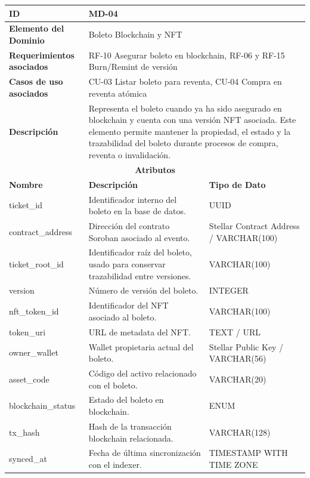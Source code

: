 \documentclass[12pt,letterpaper]{article}
\begin{document}
\begin{table}[H]
\centering
\scriptsize
\renewcommand{\arraystretch}{1.12}
\setlength{\tabcolsep}{4pt}

\begin{tabularx}{\textwidth}{|p{3.2cm}|X|p{3.8cm}|}
\hline
\textbf{ID} & MD-04 & \\ \hline

\textbf{Elemento del Dominio} & 
\multicolumn{2}{X|}{Boleto Blockchain y NFT} \\ \hline

\textbf{Requerimientos asociados} & 
\multicolumn{2}{X|}{RF-10 Asegurar boleto en blockchain, RF-06 y RF-15 Burn/Remint de versión} \\ \hline

\textbf{Casos de uso asociados} & 
\multicolumn{2}{X|}{CU-03 Listar boleto para reventa, CU-04 Compra en reventa atómica} \\ \hline

\textbf{Descripción} & 
\multicolumn{2}{X|}{Representa el boleto cuando ya ha sido asegurado en blockchain y cuenta con una versión NFT asociada. Este elemento permite mantener la propiedad, el estado y la trazabilidad del boleto durante procesos de compra, reventa o invalidación.} \\ \hline

\multicolumn{3}{|c|}{\textbf{Atributos}} \\ \hline

\textbf{Nombre} & \textbf{Descripción} & \textbf{Tipo de Dato} \\ \hline

ticket\_id & Identificador interno del boleto en la base de datos. & UUID \\ \hline
contract\_address & Dirección del contrato Soroban asociado al evento. & Stellar Contract Address / VARCHAR(100) \\ \hline
ticket\_root\_id & Identificador raíz del boleto, usado para conservar trazabilidad entre versiones. & VARCHAR(100) \\ \hline
version & Número de versión del boleto. & INTEGER \\ \hline
nft\_token\_id & Identificador del NFT asociado al boleto. & VARCHAR(100) \\ \hline
token\_uri & URL de metadata del NFT. & TEXT / URL \\ \hline
owner\_wallet & Wallet propietaria actual del boleto. & Stellar Public Key / VARCHAR(56) \\ \hline
asset\_code & Código del activo relacionado con el boleto. & VARCHAR(20) \\ \hline
blockchain\_status & Estado del boleto en blockchain. & ENUM \\ \hline
tx\_hash & Hash de la transacción blockchain relacionada. & VARCHAR(128) \\ \hline
synced\_at & Fecha de última sincronización con el indexer. & TIMESTAMP WITH TIME ZONE \\ \hline


\end{tabularx}
\end{table}
\end{document}
